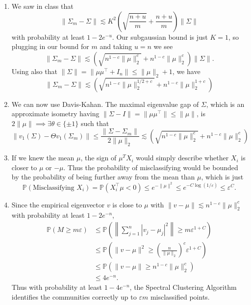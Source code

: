 \documentclass[11pt]{article}
\def\Pp{\mathbb P}
\def\E{\mathbb E}
\begin{document}
\begin{enumerate}
\begin{enumerate}
	\item We saw in class that
	\[ \|\Sigma_m - \Sigma\| \lesssim K^2 \left( \sqrt{\frac{n+u}{m}} + \frac{n+u}{m} \right)\|\Sigma\| \]
	with probability at least $ 1-2e^{-u} $. Our subgaussian bound is just $ K=1 $, so plugging in our bound for $ m $ and taking $ u=n $ we see
	\[ \|\Sigma_m - \Sigma\| \lesssim \left( \sqrt{n^{1-c}\|\mu\|_2^c} + n^{1-c}\|\mu\|_2^c \right)\|\Sigma\|. \]
	Using also that $ \|\Sigma\| = \| \mu\mu^\top + I_n \| \leq \|\mu\|_2 + 1 $, we have
	\[ \|\Sigma_m - \Sigma\| \lesssim \left( \sqrt{n^{1-c}\|\mu\|_2^{1/2+c}} + n^{1-c}\|\mu\|_2^{1+c} \right) \]
	
	\item We can now use Davis-Kahan. The maximal eigenvalue gap of $ \Sigma $, which is an approximate isometry having $ \| \Sigma - I \| = \|\mu \mu^\top\| \leq \|\mu \| $, is $ 2\|\mu\| \implies \exists \theta \in \{\pm 1\} $ such that
	\[ \| v_1(\Sigma) - \Theta v_1(\Sigma_m) \| \leq \frac{\|\Sigma - \Sigma_m\|}{2\|\mu\|_2} \lesssim \left( \sqrt{n^{1-c}\|\mu\|_2^c} + n^{1-c}\|\mu\|_2^c \right) \]
	
	\item If we knew the mean $ \mu $, the sign of $ \mu^T X_i $ would simply describe whether $ X_i $ is closer to $ \mu $ or $ -\mu $. Thus the probability of misclassifying would be bounded by the probability of being further away from the mean than $ \mu $, which is just
	\[ \Pp(\text{Misclassifying }X_i) = \Pp(X_i^\top \mu < 0) \leq e^{-\|\mu\|^2} \leq e^{-C\log(1/\varepsilon)} \leq \varepsilon^{C}. \]
	
	\item Since the empirical eigenvector $ v $ is close to $ \mu $ with $ \| v - \mu \|\lesssim n^{1-c}\|\mu\|_2^c $ with probability at least $ 1-2e^{-n} $,
	\begin{align*}
		\Pp(M \geq m\varepsilon) &\leq \Pp \left(\left\| \sum_{j=1}^{n} | v_j - \mu_j |^2  \right\| \geq m\varepsilon^{1+C} \right)\\
		&\leq \Pp \left( \|v - \mu\|^2 \geq \left(\frac{n}{\| \mu \|_2}\right)^c\varepsilon^{1+C} \right)\\
		&\leq \Pp \left( \|v - \mu\| \geq n^{1-c}\|\mu\|_2^c \right)\\
		&\leq 4e^{-n}.
	\end{align*}
	Thus with probability at least $ 1-4e^{-n} $, the Spectral Clustering Algorithm identifies the communities correctly up to $ \varepsilon m $ misclassified points.
\end{enumerate}


\end{enumerate}
\end{document}
